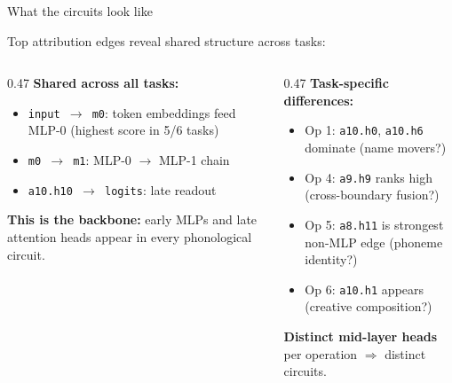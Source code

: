 \documentclass[10pt,aspectratio=169]{beamer}
\begin{document}
\begin{frame}{What the circuits look like}

\small
Top attribution edges reveal shared structure across tasks:

\vspace{0.5em}
\begin{columns}[T]
\begin{column}{0.47\textwidth}
\textbf{Shared across all tasks:}
\begin{itemize}
  \item \texttt{input $\to$ m0}: token embeddings feed MLP-0 (highest score in 5/6 tasks)
  \item \texttt{m0 $\to$ m1}: MLP-0 $\to$ MLP-1 chain
  \item \texttt{a10.h10 $\to$ logits}: late readout
\end{itemize}

\vspace{0.5em}
\textbf{This is the backbone:} early MLPs and late attention heads appear in every phonological circuit.
\end{column}

\begin{column}{0.47\textwidth}
\textbf{Task-specific differences:}
\begin{itemize}
  \item Op 1: \texttt{a10.h0}, \texttt{a10.h6} dominate (name movers?)
  \item Op 4: \texttt{a9.h9} ranks high (cross-boundary fusion?)
  \item Op 5: \texttt{a8.h11} is strongest non-MLP edge (phoneme identity?)
  \item Op 6: \texttt{a10.h1} appears (creative composition?)
\end{itemize}

\vspace{0.5em}
\textbf{Distinct mid-layer heads} per operation $\Rightarrow$ distinct circuits.
\end{column}
\end{columns}
\end{frame}

\begin{frame}
\hypertarget{sl:validation}{}
\begin{center}
\vfill
  {\setlength{\fboxrule}{2.5pt}}
\vfill
\end{center}
\end{frame}
\end{document}
